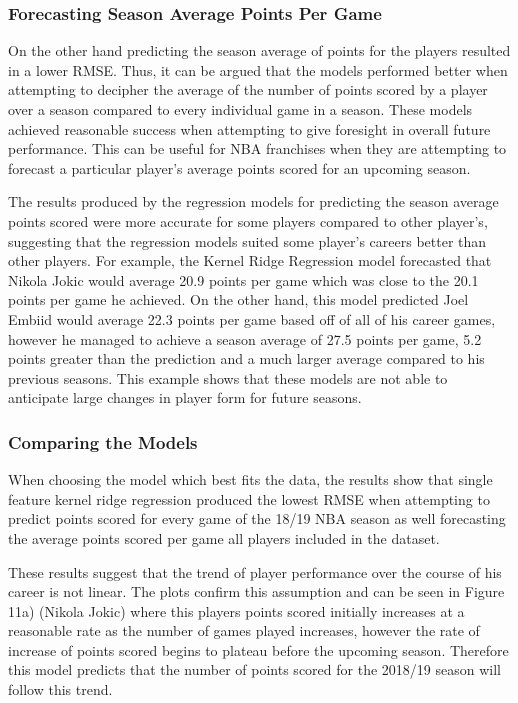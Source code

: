 \documentclass[a4paper,11pt,twoside]{article}
\begin{document}
\subsubsection{Forecasting Season Average Points Per Game}
On the other hand predicting the season average of points for the players resulted in a lower RMSE. Thus, it can be argued that the models performed better when attempting to decipher the average of the number of points scored by a player over a season compared to every individual game in a season. These models achieved reasonable success when attempting to give foresight in overall future performance. This can be useful for NBA franchises when they are attempting to forecast a particular player's average points scored for an upcoming season.

\vspace{7mm}
The results produced by the regression models for predicting the season average points scored were more accurate for some players compared to other player's, suggesting that the regression models suited some player's careers better than other players. For example, the Kernel Ridge Regression model forecasted that Nikola Jokic would average 20.9 points per game which was close to the 20.1 points per game he achieved. On the other hand, this model predicted Joel Embiid would average 22.3 points per game based off of all of his career games, however he managed to achieve a season average of 27.5 points per game, 5.2 points greater than the prediction and a much larger average compared to his previous seasons. This example shows that these models are not able to anticipate large changes in player form for future seasons.


\subsubsection{Comparing the Models}
When choosing the model which best fits the data, the results show that single feature kernel ridge regression produced the lowest RMSE when attempting to predict points scored for every game of the 18/19 NBA season as well forecasting the average points scored per game all players included in the dataset.

These results suggest that the trend of player performance over the course of his career is not linear. The plots confirm this assumption and can be seen in Figure 11a) (Nikola Jokic) where this players points scored initially increases at a reasonable rate as the number of games played increases, however the rate of increase of points scored begins to plateau before the upcoming season. Therefore this model predicts that the number of points scored for the 2018/19 season will follow this trend.
\end{document}
